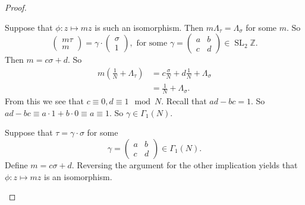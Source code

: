 \documentclass[titlepage,a4paper]{article}
\theoremstyle{theoremdd}
\theoremstyle{definitiondd}
\theoremstyle{remarkdd}
\newcommand{\Z}{\mathbb{Z}}
\newcommand{\ltr}{\par \noindent \framebox[1\width]{ $\implies$ } \hspace{.2cm}}
\newcommand{\rtl}{\par \noindent \framebox[1\width]{ $\impliedby$ } \hspace{.2cm} }
\DeclareMathOperator{\SL}{SL}
\begin{document}
\begin{proof}
\begin{enumerate}
	\ltr Suppose that $\phi: z\mapsto  m z$ is such an isomorphism.
	Then $m \Lambda_\tau = \Lambda_\sigma$ for some $m$. So \[
	\begin{pmatrix} m \tau \\ m \end{pmatrix} = 
	\gamma \cdot  \begin{pmatrix} \sigma \\ 1 \end{pmatrix} , 
	\text{ for some } \gamma = \begin{pmatrix} a & b \\ c & d \end{pmatrix} \in \SL_2 \Z
	.\] 
	Then $m = c \sigma + d$. So 
	 \begin{align*}
		 m \left( \frac{1}{N} + \Lambda_\tau \right)  &= c \frac{\sigma}{N} + d \frac{1}{N} + \Lambda_\sigma \\
		 &=  \frac{1}{N} + \Lambda_\sigma
	.\end{align*}
	From this we see that $c \equiv 0, d \equiv 1 \mod N$. Recall that  $ad - bc = 1$. 
	So  $ad - bc \equiv a\cdot 1 + b\cdot 0 \equiv a \equiv 1$. So $\gamma \in \Gamma_1(N)$.
	\rtl Suppose that $\tau = \gamma \cdot \sigma$ for some \[
		\gamma = \begin{pmatrix} a & b \\ c & d  \end{pmatrix} \in \Gamma_1(N)
	.\] 	
	Define $m = c \sigma + d$. Reversing the argument for the other implication yields that $\phi:z \mapsto m z$ is an isomorphism.		


\end{enumerate}
\end{proof}
\end{document}
